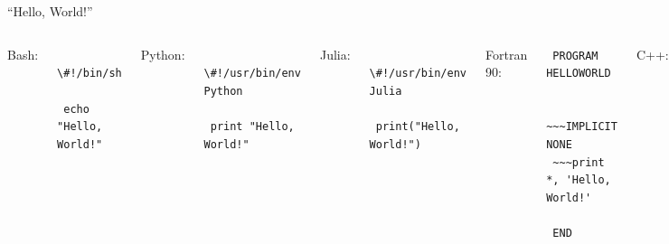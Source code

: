 
\begin{frame}{\insertsectionnumber{ |} ``Hello, World!''}

\begin{columns}

\column[c]{5cm}

Bash:
\begin{beamerboxesrounded}[lower=gray,shadow=true]{
\Verb+ \#!/bin/sh + \\
\Verb+  + \\
\Verb+ echo "Hello, World!" +             
}
\end{beamerboxesrounded}


\vspace*{0.5cm} Python:
\begin{beamerboxesrounded}[lower=gray,shadow=true]{
\Verb+ \#!/usr/bin/env Python +   \\
\Verb+  +              \\
\Verb+ print "Hello, World!" + 
}
\end{beamerboxesrounded}


\vspace*{0.5cm} Julia:
\begin{beamerboxesrounded}[lower=gray,shadow=true]{
\Verb+ \#!/usr/bin/env Julia + \\
\Verb+  +              \\
\Verb+ print("Hello, World!") + 
}
\end{beamerboxesrounded}

\column[c]{5.5cm}

Fortran 90:
\begin{beamerboxesrounded}[lower=gray,shadow=true]{
\Verb+ PROGRAM HELLOWORLD +  \\
\Verb+ + \\
\Verb+ ~~~IMPLICIT NONE + \\
\Verb+ ~~~print *, 'Hello, World!' + \\
\Verb+ + \\
\Verb+ END + 
}
\end{beamerboxesrounded}


\vspace*{0.5cm} C++:
\begin{beamerboxesrounded}[lower=gray,shadow=true]{
\Verb+ \#include <iostream> +   \\
\Verb+                              +\\
\Verb+ int main() \{ +              \\
\Verb+ ~~~std::cout << "Hello, World!"; + \\
\Verb+ ~~~return 0; + \\
\Verb+ \} + 
}
\end{beamerboxesrounded}


\end{columns}

\end{frame}



